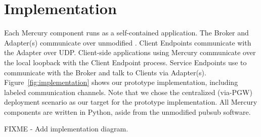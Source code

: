 \section*{Implementation}

Each Mercury component runs as a self-contained application. The
Broker and Adapter(s) communicate over unmodified \pubsub. Client
Endpoints communicate with the Adapter over UDP. Client-side
applications using Mercury communicate over the local loopback with
the Client Endpoint process. Service Endpoints use \pubsub to
communicate with the Broker and talk to Clients via
Adapter(s). Figure~\ref{fig:implementation} shows our prototype
implementation, including labeled communication channels. Note that we
chose the centralized (via-PGW) deployment scenario as our target for
the prototype implementation.  All Mercury components are written in Python,
aside from the unmodified \pubsub pubsub software.

FIXME - Add implementation diagram.

